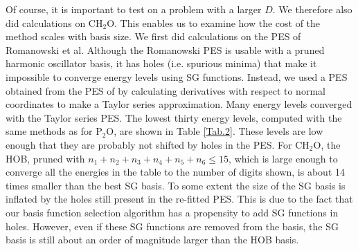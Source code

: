 Of course, it is important to test  on a problem with a larger $D$.    We therefore also did calculations on  CH$_2$O.   This 
enables us to examine how the cost of the  method scales with  basis size.
%
We first did calculations on the PES of   Romanowski et al.\cite{Romanowski1985}   
Although the   Romanowski  PES is  usable with a pruned  harmonic oscillator basis,  it has holes 
(i.e. spurious minima)
that 
make it  impossible to converge energy levels using SG functions.  
%
Instead,  we used a PES    obtained from the PES of   by
calculating derivatives with respect to normal coordinates to make a Taylor series approximation. \cite{gab}
%
Many energy levels converged with the  Taylor series  PES.   
%
 The lowest 
thirty energy levels, computed with the same methods as for P$_2$O,  are shown in Table \ref{Tab.2}. 
%
These levels are low enough that they are probably not shifted by holes in the PES.
%
For  CH$_2$O, the HOB,  pruned with    $ n_1 +  n_2 +  n_3 +n_4 +n_5 + n_6 \leq 15  $,
%
 which is large enough to converge all the energies in the table to the number of digits shown, 
is about 14 times   smaller  than the best SG basis.   
To some extent the size of the  SG basis is inflated by the holes   
still present in the re-fitted PES.  
This is due to the fact that our basis function selection algorithm  
 has a propensity to add SG functions    in    holes.   However, even    if these  SG functions are removed from the basis,  the SG basis is still about  an order of magnitude 
larger than the HOB basis. 
%
%






